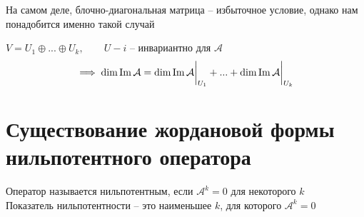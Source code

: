 \begin{remark}
	На самом деле, блочно-диагональная матрица -- избыточное условие, однако нам понадобится именно такой случай
\end{remark}

\begin{implication}
	$ V = U_1 \oplus ... \oplus U_k, \qquad U-i $ -- инвариантно для $ \mathcal{A} $
	$$ \implies \dim \operatorname{Im} \mathcal{A} = \dim \operatorname{Im} \mathcal{A}\bigg|_{U_1}^{} + ... + \dim \operatorname{Im} \mathcal{A}\bigg|_{U_k}^{} $$
\end{implication}

\section{Существование жордановой формы нильпотентного оператора}

\begin{definition}
	Оператор называется нильпотентным, если $ \mathcal{A}^k = 0 $ для некоторого $ k $ \\
	Показатель нильпотентности -- это наименьшее $ k $, для которого $ \mathcal{A}^k = 0 $
\end{definition}

